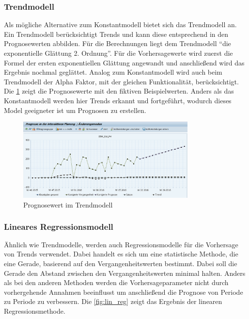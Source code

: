 \subsubsection{Trendmodell}
Als mögliche Alternative zum Konstantmodell bietet sich das Trendmodell an. Ein Trendmodell berücksichtigt Trends und kann diese entsprechend in den Prognosewerten abbilden. Für die Berechnungen liegt dem Trendmodell "`die exponentielle Glättung 2. Ordnung"'\cite[Abschnitt 4, Seite 14]{scm:script_17_1}. Für die Vorhersagewerte wird zuerst die Formel der ersten exponentiellen Glättung angewandt und anschließend wird das Ergebnis nochmal geglättet. \cite{scm:second_order_exp_4} Analog zum Konstantmodell wird auch beim Trendmodell der Alpha Faktor, mit der gleichen Funktionalität, berücksichtigt. Die \ref{fig:trend} zeigt die Prognosewerte mit den fiktiven Beispielwerten. Anders als das Konstantmodell werden hier Trends erkannt und fortgeführt, wodurch dieses Model geeigneter ist um Prognosen zu erstellen.

\begin{figure}[h]
	\centering
	\includegraphics[width=0.8\textwidth]{../pics/Trendmodell_nko}
	\caption{Prognosewert im Trendmodell}
	\label{fig:trend}
\end{figure}

\subsubsection{Lineares Regressionsmodell}
Ähnlich wie Trendmodelle, werden auch Regressionsmodelle für die Vorhersage von Trends verwendet. Dabei handelt es sich um eine statistische Methode, die eine Gerade, basierend auf den Vergangenheitswerten bestimmt. Dabei soll die Gerade den Abstand zwischen den Vergangenheitswerten minimal halten. Anders als bei den anderen Methoden werden die Vorhersageparameter nicht durch vorhergehende Annahmen beeinflusst um anschließend die Prognose von Periode zu Periode zu verbessern. \cite{scm:lin_reg_5}
Die \ref{fig:lin_reg} zeigt das Ergebnis der linearen Regressionsmethode. 


